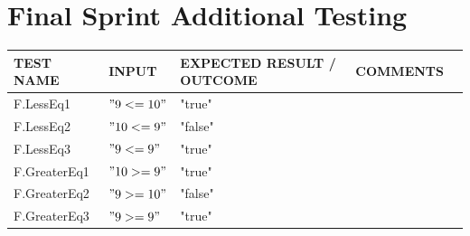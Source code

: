 \documentclass[a4paper, oneside, 11pt]{report}
\begin{document}
    \section{Final Sprint Additional Testing}
    \label{FinalTest}
    \begin{tabular}{|p{1.5in}|p{1.5in}|p{1.6in}|p{1.6in}|p{2.4in}|}
        \hline
        TEST NAME       & INPUT                     & EXPECTED RESULT / OUTCOME              & COMMENTS                                \\
        \hline
        F.LessEq1                         & $"9 <= 10"$                                & "true"        &                \\
        \hline
        F.LessEq2                         & $"10 <= 9"$                                & "false"       &                \\
        \hline
        F.LessEq3                         & $"9 <= 9"$                                 & "true"        &                \\
        \hline
        F.GreaterEq1                      & $"10 >= 9"$                                & "true"        &                \\
        \hline
        F.GreaterEq2                      & $"9 >= 10"$                                & "false"       &                \\
        \hline
        F.GreaterEq3                      & $"9 >= 9"$                                 & "true"        &                \\
        \hline
    \end{tabular}
\end{document}
